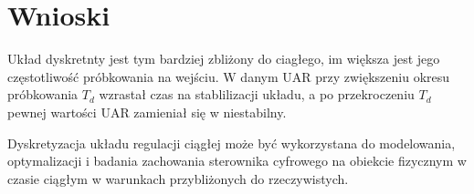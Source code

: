 \documentclass{article}
\begin{document}
\section{Wnioski}


Układ dyskretnty jest tym bardziej zbliżony do ciagłego, im większa jest jego częstotliwość próbkowania na wejściu. W danym UAR przy zwiększeniu okresu próbkowania \(T_d\) wzrastał czas na stablilizacji układu, a po przekroczeniu \(T_d\) pewnej wartości UAR zamieniał się w niestabilny.
\par
Dyskretyzacja układu regulacji ciągłej może być wykorzystana do modelowania, optymalizacji i badania zachowania sterownika cyfrowego na obiekcie fizycznym w czasie ciągłym w warunkach przybliżonych do rzeczywistych.
\end{document}
